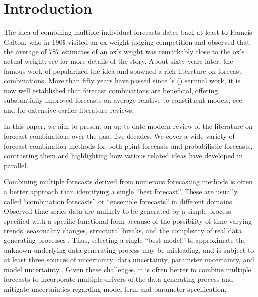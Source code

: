 \documentclass[a4paper,11pt]{article}
\def\citeapos#1{\citeauthor{#1}'s (\citeyear{#1})}
\begin{document}
\newpage

{}

\section{Introduction}
\label{sec:introduction}

The idea of combining multiple individual forecasts dates back at least to Francis Galton, who in 1906 visited an ox-weight-judging competition and observed that the average of 787 estimates of an ox's weight was remarkably close to the ox's actual weight; see \citet{Surowiecki2005-wisdom} for more details of the story. About sixty years later, the famous work of \citet{Bates1969-yj} popularized the idea and spawned a rich literature on forecast combinations. More than fifty years have passed since \citeapos{Bates1969-yj} seminal work, it is now well established that forecast combinations are beneficial, offering substantially improved forecasts on average relative to constituent models; see \citet{Clemen1989-fb} and \citet{Timmermann2006-en} for extensive earlier literature reviews.

In this paper, we aim to present an up-to-date modern review of the literature on forecast combinations over the past five decades. We cover a wide variety of forecast combination methods for both point forecasts and probabilistic forecasts, contrasting them and highlighting how various related ideas have developed in parallel.

Combining multiple forecasts derived from numerous forecasting methods is often a better approach than identifying a single ``best forecast''. These are usually called ``combination forecasts'' or ``ensemble forecasts'' in different domains. Observed time series data are unlikely to be generated by a simple process specified with a specific functional form because of the possibility of time-varying trends, seasonality changes, structural breaks, and the complexity of real data generating processes \citep{Clements1998-bu}. Thus, selecting a single ``best model'' to approximate the unknown underlying data generating process may be misleading, and is subject to at least three sources of uncertainty: data uncertainty, parameter uncertainty, and model uncertainty \citep{Petropoulos2018-fw,Kourentzes2019-na}. Given these challenges, it is often better to combine multiple forecasts to incorporate multiple drivers of the data generating process and mitigate uncertainties regarding model form and parameter specification.
\end{document}
